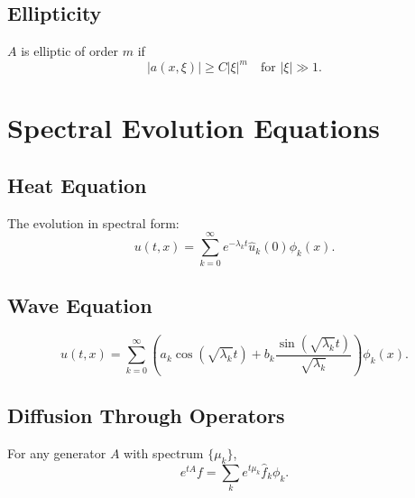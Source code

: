 \subsection{Ellipticity}

$A$ is elliptic of order $m$ if
\[
|a(x,\xi)| \ge C |\xi|^m
\quad
\text{for } |\xi|\gg 1.
\]

\section{Spectral Evolution Equations}

\subsection{Heat Equation}

The evolution in spectral form:
\[
u(t,x)
  = \sum_{k=0}^\infty e^{-\lambda_k t} \hat{u}_k(0) \phi_k(x).
\]

\subsection{Wave Equation}

\[
u(t,x)
  = \sum_{k=0}^\infty
    \left(
    a_k \cos(\sqrt{\lambda_k} t)
    + b_k \frac{\sin(\sqrt{\lambda_k} t)}{\sqrt{\lambda_k}}
    \right)
    \phi_k(x).
\]

\subsection{Diffusion Through Operators}

For any generator $A$ with spectrum $\{\mu_k\}$,
\[
e^{tA} f = \sum_k e^{t\mu_k} \hat{f}_k \phi_k.
\]


